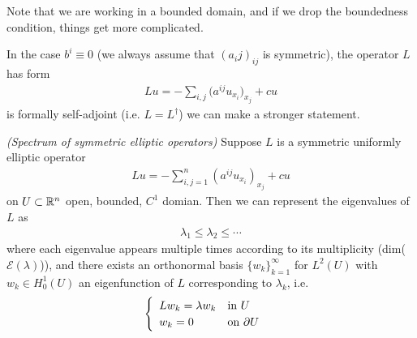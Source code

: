 \documentclass[12pt,a4paper]{report}
\begin{document}
Note that we are working in a bounded domain, and if we drop the boundedness condition, things get more complicated.
\s

In the case $b^i \equiv 0$ (we always assume that $(a_ij)_{ij}$ is symmetric), the operator $L$ has form
\begin{align*}
Lu = -\sum_{i,j} \big( a^{ij}u_{x_i} \big)_{x_j} + cu
\end{align*}
is formally self-adjoint (i.e. $L = L^{\dagger}$) we can make a stronger statement.
\s

\thm \emph{(Spectrum of symmetric elliptic operators)} Suppose $L$ is a symmetric uniformly elliptic operator
\begin{align*}
Lu = -\sum_{i,j=1}^n (a^{ij}u_{x_i})_{x_j} + cu
\end{align*}
on $U \subset \mathbb{R}^n$ open, bounded, $C^1$ domian. Then we can represent the eigenvalues of $L$ as
\begin{align*}
\lambda_1 \leq \lambda_2 \leq \cdots
\end{align*}
where each eigenvalue appears multiple times according to its multiplicity (dim($\mathscr{E}(\lambda)$)), and there exists an orthonormal basis $\{w_k \}_{k=1}^{\infty}$ for $L^2(U)$ with $w_k \in H_0^1(U)$ an eigenfunction of $L$ corresponding to $\lambda_k$, i.e.
\begin{align*}
\begin{cases}
\begin{array}{ll}
Lw_k = \lambda w_k & \text{in } U \\
w_k = 0 & \text{on } \partial U
\end{array}
\end{cases}
\end{align*}
\end{document}
